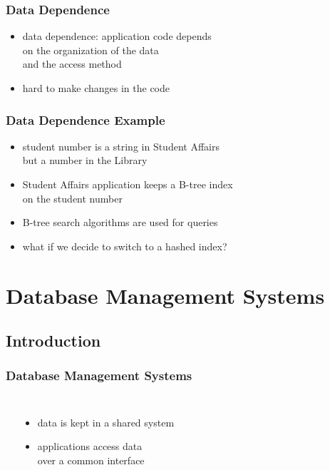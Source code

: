 \documentclass[dvipsnames]{beamer}
\theoremstyle{plain}
\begin{document}
\begin{frame}
  \frametitle{Data Dependence}

  \begin{itemize}
    \item \alert{data dependence}: application code depends\\
      on the organization of the data\\
      and the access method

    \medskip
    \item hard to make changes in the code
  \end{itemize}
\end{frame}

\begin{frame}
  \frametitle{Data Dependence Example}

  \begin{itemize}
    \item student number is a string in Student Affairs\\
      but a number in the Library

    \medskip
    \item Student Affairs application keeps a B-tree index\\
      on the student number
    \item B-tree search algorithms are used for queries
    \smallskip
    \item what if we decide to switch to a hashed index?
  \end{itemize}
\end{frame}

\section{Database Management Systems}

\subsection{Introduction}

\begin{frame}
  \frametitle{Database Management Systems}

  \begin{columns}[b]
    \begin{center}
    \end{center}

    \begin{itemize}
      \item data is kept in a shared system
      \item applications access data\\
        over a common interface
    \end{itemize}
  \end{columns}
\end{frame}
\end{document}
